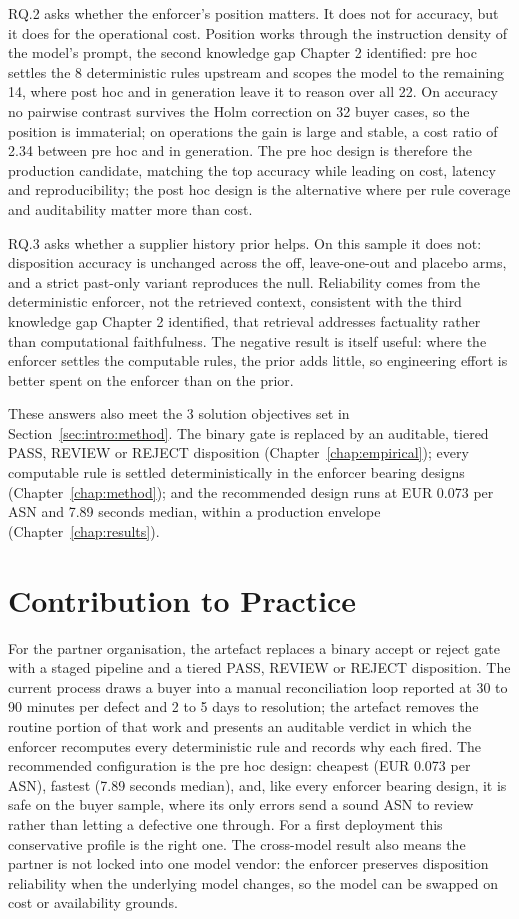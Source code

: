 RQ.2 asks whether the enforcer's position matters. It does not for accuracy, but it does for the operational cost. Position works through the instruction density of the model's prompt, the second knowledge gap Chapter 2 identified: pre hoc settles the 8 deterministic rules upstream and scopes the model to the remaining 14, where post hoc and in generation leave it to reason over all 22. On accuracy no pairwise contrast survives the Holm correction on 32 buyer cases, so the position is immaterial; on operations the gain is large and stable, a cost ratio of 2.34 between pre hoc and in generation. The pre hoc design is therefore the production candidate, matching the top accuracy while leading on cost, latency and reproducibility; the post hoc design is the alternative where per rule coverage and auditability matter more than cost.

RQ.3 asks whether a supplier history prior helps. On this sample it does not: disposition accuracy is unchanged across the off, leave-one-out and placebo arms, and a strict past-only variant reproduces the null. Reliability comes from the deterministic enforcer, not the retrieved context, consistent with the third knowledge gap Chapter 2 identified, that retrieval addresses factuality rather than computational faithfulness. The negative result is itself useful: where the enforcer settles the computable rules, the prior adds little, so engineering effort is better spent on the enforcer than on the prior.

These answers also meet the 3 solution objectives set in Section~\ref{sec:intro:method}. The binary gate is replaced by an auditable, tiered PASS, REVIEW or REJECT disposition (Chapter~\ref{chap:empirical}); every computable rule is settled deterministically in the enforcer bearing designs (Chapter~\ref{chap:method}); and the recommended design runs at EUR 0.073 per ASN and 7.89 seconds median, within a production envelope (Chapter~\ref{chap:results}).

\section{Contribution to Practice}
\label{sec:concl:practice}

For the partner organisation, the artefact replaces a binary accept or reject gate with a staged pipeline and a tiered PASS, REVIEW or REJECT disposition. The current process draws a buyer into a manual reconciliation loop reported at 30 to 90 minutes per defect and 2 to 5 days to resolution; the artefact removes the routine portion of that work and presents an auditable verdict in which the enforcer recomputes every deterministic rule and records why each fired. The recommended configuration is the pre hoc design: cheapest (EUR 0.073 per ASN), fastest (7.89 seconds median), and, like every enforcer bearing design, it is safe on the buyer sample, where its only errors send a sound ASN to review rather than letting a defective one through. For a first deployment this conservative profile is the right one. The cross-model result also means the partner is not locked into one model vendor: the enforcer preserves disposition reliability when the underlying model changes, so the model can be swapped on cost or availability grounds.

